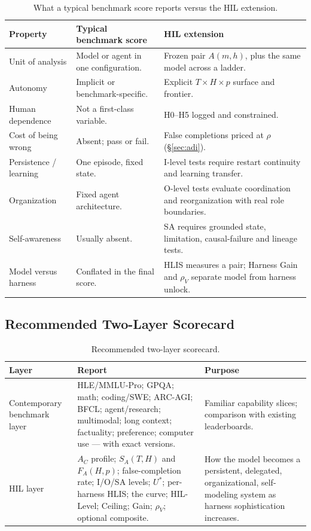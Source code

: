 \documentclass[11pt]{article}
\theoremstyle{definition}
\newcommand{\SA}{\ensuremath{S_A(T,H)}}
\newcommand{\FA}{\ensuremath{F_A(H,p)}}
\newcommand{\rhov}{\ensuremath{\rho_V}}
\begin{document}
\begin{table}[H]
\centering\small
\begin{tabularx}{\textwidth}{@{}lYY@{}}
\toprule
Property & Typical benchmark score & HIL extension \\
\midrule
Unit of analysis & Model or agent in one configuration. & Frozen pair $A(m,h)$, plus the same model across a ladder. \\
Autonomy & Implicit or benchmark-specific. & Explicit $T \times H \times p$ surface and frontier. \\
Human dependence & Not a first-class variable. & H0--H5 logged and constrained. \\
Cost of being wrong & Absent; pass or fail. & False completions priced at $\rho$ (\S\ref{sec:adi}). \\
Persistence / learning & One episode, fixed state. & I-level tests require restart continuity and learning transfer. \\
Organization & Fixed agent architecture. & O-level tests evaluate coordination and reorganization with real role boundaries. \\
Self-awareness & Usually absent. & SA requires grounded state, limitation, causal-failure and lineage tests. \\
Model versus harness & Conflated in the final score. & HLIS measures a pair; Harness Gain and \rhov{} separate model from harness unlock. \\
\bottomrule
\end{tabularx}
\caption{What a typical benchmark score reports versus the HIL extension.}
\label{tab:hilext}
\end{table}

\subsection{Recommended Two-Layer Scorecard}

\begin{table}[H]
\centering\small
\begin{tabularx}{\textwidth}{@{}lYY@{}}
\toprule
Layer & Report & Purpose \\
\midrule
Contemporary benchmark layer & HLE/MMLU-Pro; GPQA; math; coding/SWE; ARC-AGI; BFCL; agent/research; multimodal; long context; factuality; preference; computer use --- with exact versions. & Familiar capability slices; comparison with existing leaderboards. \\
HIL layer & $A_C$ profile; \SA{} and \FA{}; false-completion rate; I/O/SA levels; $U^{*}$; per-harness HLIS; the curve; HIL-Level; Ceiling; Gain; \rhov{}; optional composite. & How the model becomes a persistent, delegated, organizational, self-modeling system as harness sophistication increases. \\
\bottomrule
\end{tabularx}
\caption{Recommended two-layer scorecard.}
\label{tab:twolayer}
\end{table}
\end{document}
